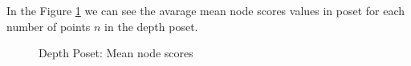 \documentclass{article}
\begin{document}
\par In the Figure \ref{fig:scores_node_mean} we can see the avarage mean node scores values in poset for each number of points $n$ in the depth poset.
\begin{figure}[ht]
  \vspace{-96pt}
  \centering
  \hspace*{-0.18999999999999995\textwidth}
  \caption{Depth Poset: Mean node scores}
  \label{fig:scores_node_mean}
\end{figure}
\end{document}
